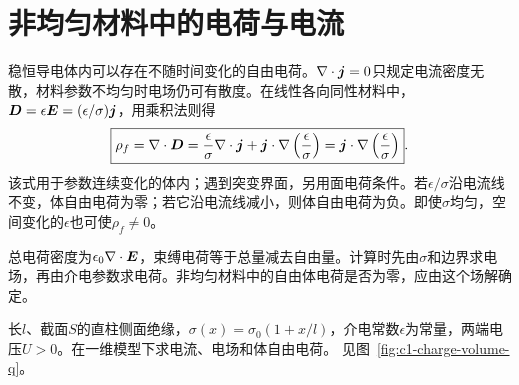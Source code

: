 \section{非均匀材料中的电荷与电流}
稳恒导电体内可以存在不随时间变化的自由电荷。$\nabla\cdot\bm{j}=0$只规定电流密度无散，材料参数不均匀时电场仍可有散度。在线性各向同性材料中，$\bm{D}=\epsilon\bm{E}=(\epsilon/\sigma)\bm{j}$，用乘积法则得
\[
 \boxed{\rho_f=\nabla\cdot\bm{D}
 =\frac{\epsilon}{\sigma}\nabla\cdot\bm{j}
 +\bm{j}\cdot\nabla\left(\frac{\epsilon}{\sigma}\right)
 =\bm{j}\cdot\nabla\left(\frac{\epsilon}{\sigma}\right)}.
\]
该式用于参数连续变化的体内；遇到突变界面，另用面电荷条件。若$\epsilon/\sigma$沿电流线不变，体自由电荷为零；若它沿电流线减小，则体自由电荷为负。即使$\sigma$均匀，空间变化的$\epsilon$也可使$\rho_f\ne0$。

总电荷密度为$\epsilon_0\nabla\cdot\bm{E}$，束缚电荷等于总量减去自由量。计算时先由$\sigma$和边界求电场，再由介电参数求电荷。非均匀材料中的自由体电荷是否为零，应由这个场解确定。

\begin{example}[分层直柱中的连续体电荷]\label{ex:c1-charge-volume}
长$l$、截面$S$的直柱侧面绝缘，$\sigma(x)=\sigma_0(1+x/l)$，介电常数$\epsilon$为常量，两端电压$U>0$。在一维模型下求电流、电场和体自由电荷。 见图~\ref{fig:c1-charge-volume-q}。
\end{example}

